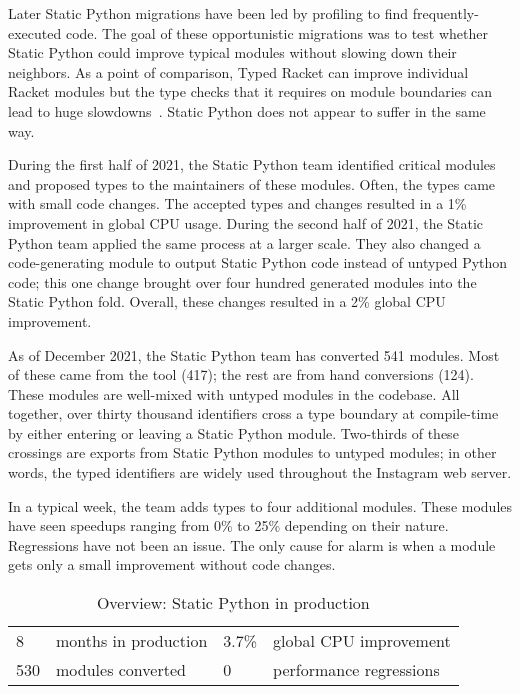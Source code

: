 \documentclass[english,cleveref,submission]{programming}
\newcommand{\SP}{Static Python}
\begin{document}
Later \SP{} migrations have been led by profiling to find frequently-executed code.
The goal of these opportunistic migrations was to test whether \SP{} could
improve typical modules without slowing down their neighbors.
As a point of comparison, Typed Racket can improve individual Racket
modules but the type checks that it requires on module boundaries
can lead to huge slowdowns~\cite{tfgnvf-popl-2016,gtnffvf-jfp-2019}.
\SP{} does not appear to suffer in the same way.

During the first half of 2021, the \SP{} team identified critical
modules and proposed types to the maintainers of these modules.
Often, the types came with small code changes.
The accepted types and changes resulted in a 1\% improvement
in global CPU usage.
During the second half of 2021, the \SP{} team applied the same
process at a larger scale.
They also changed a code-generating module to output \SP{} code instead
of untyped Python code;
this one change brought over four hundred generated modules into the \SP{} fold.
Overall, these changes resulted in a 2\% global CPU improvement.

As of December 2021, the \SP{} team has converted 541 modules.
Most of these came from the tool (417); the rest
are from hand conversions (124).
These modules are well-mixed with untyped modules in the codebase.
All together, over thirty thousand identifiers cross a type boundary
at compile-time by either entering or leaving a \SP{} module.
Two-thirds of these crossings are exports from \SP{} modules
to untyped modules;
in other words, the typed identifiers are widely used throughout the Instagram web server.

In a typical week, the team adds types to four additional modules.
These modules have seen speedups ranging from 0\% to 25\% depending
on their nature.
Regressions have not been an issue.
The only cause for alarm is when a module gets only a small improvement
without code changes.

\begin{table}
  \caption{Overview: \SP{} in production}
  \label{t:prod-stat}
  \begin{tabular}{l@{~~}ll@{~~}l}
    8     & months in production & 3.7\% & global CPU improvement \\
    530   & modules converted  &  0 & performance regressions
  \end{tabular}
\end{table}
\end{document}
